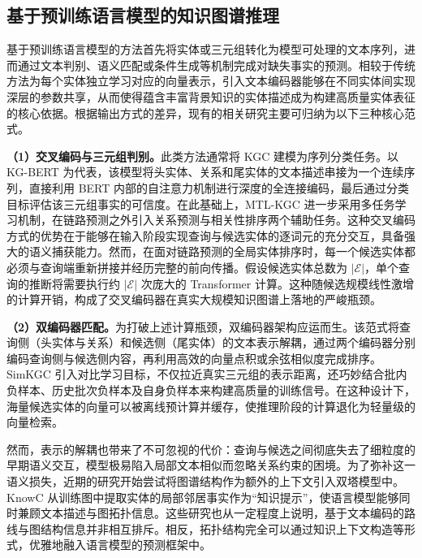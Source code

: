 \subsection{基于预训练语言模型的知识图谱推理}

基于预训练语言模型的方法首先将实体或三元组转化为模型可处理的文本序列，进而通过文本判别、语义匹配或条件生成等机制完成对缺失事实的预测。相较于传统方法为每个实体独立学习对应的向量表示，引入文本编码器能够在不同实体间实现深层的参数共享，从而使得蕴含丰富背景知识的实体描述成为构建高质量实体表征的核心依据。根据输出方式的差异，现有的相关研究主要可归纳为以下三种核心范式。

\textbf{（1）交叉编码与三元组判别。}此类方法通常将 KGC 建模为序列分类任务。以 KG-BERT 为代表，该模型将头实体、关系和尾实体的文本描述串接为一个连续序列，直接利用 BERT 内部的自注意力机制进行深度的全连接编码，最后通过分类目标评估该三元组事实的可信度\cite{yao2019kgbert}。在此基础上，MTL-KGC 进一步采用多任务学习机制，在链路预测之外引入关系预测与相关性排序两个辅助任务\cite{kim2020mtlkgc}。这种交叉编码方式的优势在于能够在输入阶段实现查询与候选实体的逐词元的充分交互，具备强大的语义捕获能力。然而，在面对链路预测的全局实体排序时，每一个候选实体都必须与查询端重新拼接并经历完整的前向传播。假设候选实体总数为 $\vert{}\mathcal{E}\vert{}$，单个查询的推断将需要执行约 $\vert{}\mathcal{E}\vert{}$ 次庞大的 Transformer 计算。这种随候选规模线性激增的计算开销，构成了交叉编码器在真实大规模知识图谱上落地的严峻瓶颈。

\textbf{（2）双编码器匹配。}为打破上述计算瓶颈，双编码器架构应运而生。该范式将查询侧（头实体与关系）和候选侧（尾实体）的文本表示解耦，通过两个编码器分别编码查询侧与候选侧内容，再利用高效的向量点积或余弦相似度完成排序。SimKGC 引入对比学习目标，不仅拉近真实三元组的表示距离，还巧妙结合批内负样本、历史批次负样本及自身负样本来构建高质量的训练信号\cite{wang2022simkgc}。在这种设计下，海量候选实体的向量可以被离线预计算并缓存，使推理阶段的计算退化为轻量级的向量检索。

然而，表示的解耦也带来了不可忽视的代价：查询与候选之间彻底失去了细粒度的早期语义交互，模型极易陷入局部文本相似而忽略关系约束的困境。为了弥补这一语义损失，近期的研究开始尝试将图谱结构作为额外的上下文引入双塔模型中。KnowC 从训练图中提取实体的局部邻居事实作为“知识提示”，使语言模型能够同时兼顾文本描述与图拓扑信息\cite{yang2024knowc}。这些研究也从一定程度上说明，基于文本编码的路线与图结构信息并非相互排斥。相反，拓扑结构完全可以通过知识上下文构造等形式，优雅地融入语言模型的预测框架中。

